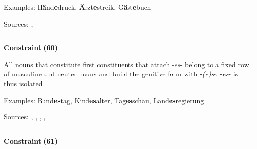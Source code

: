 \vspace{0.3em}

\noindent
Examples: H\textbf{ä}nd\textbf{e}druck, \textbf{Ä}rzt\textbf{e}streik, G\textbf{ä}st\textbf{e}buch

\vspace{0.3em}

\noindent
Sources: \citet[228]{eisenberg_2013}, \citet[5]{nuebling_szczepaniak_2008}


\hrule




\vspace{0.4em}

\begin{center}
\textbf{Constraint (60)}
\end{center}

\noindent
\underline{All} nouns that constitute first constituents that attach -\textit{es}- belong to a fixed row of masculine and neuter nouns and build the genitive form with -\textit{(e)s}-. -\textit{es}- is thus isolated.
\vspace{0.35em}


\vspace{0.3em}

\noindent
Examples: Bund\textbf{es}tag, Kind\textbf{es}alter, Tag\textbf{es}schau, Land\textbf{es}regierung

\vspace{0.3em}

\noindent
Sources: \citet[229]{eisenberg_2013}, \citet[11, 18]{kuerschner_2010}, \citet[3, 7]{nuebling_szczepaniak_2008}, \citet[81]{nuebling_szczepaniak_2013}, \citet[8]{schaefer_pankratz_2018}


\hrule




\vspace{0.4em}

\begin{center}
\textbf{Constraint (61)}
\end{center}

